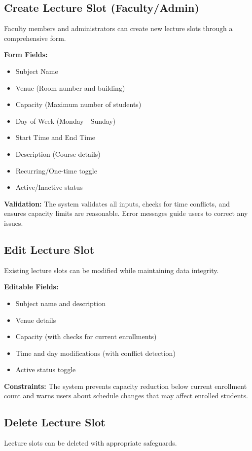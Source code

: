 \subsection{Create Lecture Slot (Faculty/Admin)}
Faculty members and administrators can create new lecture slots through a comprehensive form.

\textbf{Form Fields:}
\begin{itemize}
    \item Subject Name
    \item Venue (Room number and building)
    \item Capacity (Maximum number of students)
    \item Day of Week (Monday - Sunday)
    \item Start Time and End Time
    \item Description (Course details)
    \item Recurring/One-time toggle
    \item Active/Inactive status
\end{itemize}

\textbf{Validation:} The system validates all inputs, checks for time conflicts, and ensures capacity limits are reasonable. Error messages guide users to correct any issues.

\subsection{Edit Lecture Slot}
Existing lecture slots can be modified while maintaining data integrity.

\textbf{Editable Fields:}
\begin{itemize}
    \item Subject name and description
    \item Venue details
    \item Capacity (with checks for current enrollments)
    \item Time and day modifications (with conflict detection)
    \item Active status toggle
\end{itemize}

\textbf{Constraints:} The system prevents capacity reduction below current enrollment count and warns users about schedule changes that may affect enrolled students.

\subsection{Delete Lecture Slot}
Lecture slots can be deleted with appropriate safeguards.

